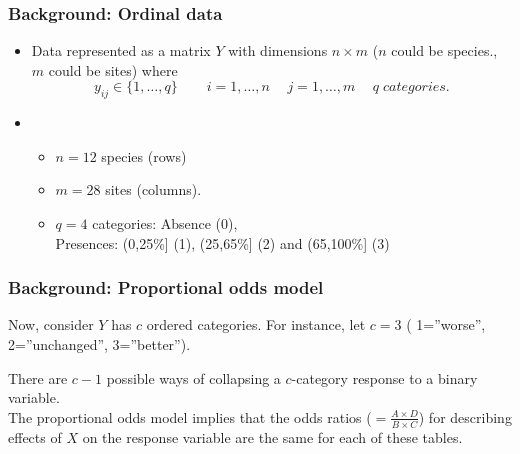 \documentclass[xcolor=svgnames]{beamer}
\begin{document}
\begin{frame}\frametitle{Background: Ordinal data}

\begin{itemize}
 \item 
Data represented as a matrix $Y$ with dimensions $n\times m$ ($n$ could be species., $m$ could be sites) where
  \begin{equation*} 
      y_{ij} \in \{1,\ldots,q\} \hspace{25pt} i=1,\ldots,n \hspace{15pt} j=1,\ldots,m \hspace{15pt} q\;categories.
  \end{equation*}
\pause
  \item \color{black}{For example, Spider data: }
      \begin{itemize}
	\scriptsize
	\item $n=12$ species (rows)
	\item $m=28$ sites (columns).
	\item $q=4$ categories: Absence (0),\\ \hspace{2cm} Presences: (0,25\%] (1), (25,65\%] (2) and (65,100\%] (3)
\pause
      \end{itemize}
\vspace*{-0.5in}
\begin{minipage}{0.6\textwidth}{}\end{minipage}
\end{itemize}

\end{frame}
\begin{frame}\frametitle{Background: Proportional odds model}

Now, consider $Y$ has $c$ ordered categories.  For instance, let $c=3$ ( 1=''worse'', 2=''unchanged'', 3=''better'').

\pause
\begin{minipage}{0.5\textwidth}{}\end{minipage}
\begin{minipage}{0.45\textwidth}{\vspace{-1.5in}There are $c-1$  possible ways of collapsing a $c$-category response to a binary variable.\vspace{.2in}  \\  The proportional odds model implies that the odds
ratios ($=\frac{A\times D}{B\times C}$) for describing effects of $X$ on the response variable are the same for each of these tables.
}\end{minipage}
\end{frame}
\end{document}
